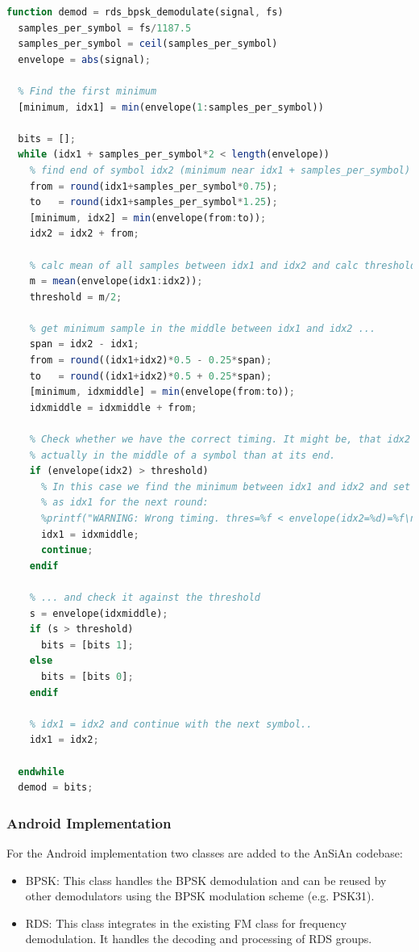 \begin{lstlisting}[label=lst:octave_rds_bpsk, caption=Octave implementation of the BPSK demodulation, language=octave]
function demod = rds_bpsk_demodulate(signal, fs)
  samples_per_symbol = fs/1187.5
  samples_per_symbol = ceil(samples_per_symbol)
  envelope = abs(signal);
  
  % Find the first minimum
  [minimum, idx1] = min(envelope(1:samples_per_symbol))
  
  bits = [];
  while (idx1 + samples_per_symbol*2 < length(envelope))
    % find end of symbol idx2 (minimum near idx1 + samples_per_symbol)
    from = round(idx1+samples_per_symbol*0.75);
    to   = round(idx1+samples_per_symbol*1.25);
    [minimum, idx2] = min(envelope(from:to));
    idx2 = idx2 + from;
    
    % calc mean of all samples between idx1 and idx2 and calc threshold = mean/2
    m = mean(envelope(idx1:idx2));
    threshold = m/2;
    
    % get minimum sample in the middle between idx1 and idx2 ...
    span = idx2 - idx1;
    from = round((idx1+idx2)*0.5 - 0.25*span);
    to   = round((idx1+idx2)*0.5 + 0.25*span);
    [minimum, idxmiddle] = min(envelope(from:to));
    idxmiddle = idxmiddle + from;
    
    % Check whether we have the correct timing. It might be, that idx2 is
    % actually in the middle of a symbol than at its end.
    if (envelope(idx2) > threshold)
      % In this case we find the minimum between idx1 and idx2 and set it
      % as idx1 for the next round:
      %printf("WARNING: Wrong timing. thres=%f < envelope(idx2=%d)=%f\n",threshold,idx2,envelope(idx2));
      idx1 = idxmiddle;
      continue;
    endif
    
    % ... and check it against the threshold
    s = envelope(idxmiddle);
    if (s > threshold)
      bits = [bits 1];
    else
      bits = [bits 0];
    endif
    
    % idx1 = idx2 and continue with the next symbol..
    idx1 = idx2;
    
  endwhile
  demod = bits;
\end{lstlisting}


\subsubsection{Android Implementation}

For the Android implementation two classes are added to the AnSiAn codebase:
\begin{itemize}
	\item BPSK: This class handles the \ac{BPSK} demodulation and can be
		reused by other demodulators using the \ac{BPSK} modulation scheme
		(e.g. PSK31).
	\item RDS: This class integrates in the existing FM class for frequency
		demodulation. It handles the decoding and processing of \ac{RDS}
		groups. 
\end{itemize}

